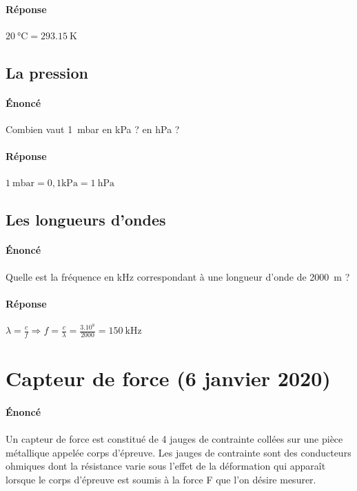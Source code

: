 \documentclass{article}
\begin{document}
\paragraph{Réponse}
$\SI{20}{\celsius} = \SI{293,15}{\kelvin}$

\subsection{La pression}
\paragraph{Énoncé}
Combien vaut \SI{1}{\milli \bar} en \si{\kilo \pascal} ? en \si{\hecto \pascal} ?

\paragraph{Réponse}
$\SI{1}{\milli \bar} = 0,1\si{\kilo \pascal} = \SI{1}{\hecto \pascal}
$

\subsection{Les longueurs d'ondes}
\paragraph{Énoncé}
Quelle est la fréquence en \si{\kilo\hertz} correspondant à une longueur d'onde de \SI{2000}{\meter} ?

\paragraph{Réponse}
$\lambda = \frac{c}{f} \Rightarrow f = \frac{c}{\lambda} = \frac{3.10^8}{2000} = \SI{150}{\kilo\hertz}$


\newpage
\section{Capteur de force (6 janvier 2020)}
\paragraph{Énoncé}
\paragraph{}
Un capteur de force est constitué de 4 jauges de contrainte collées sur une pièce métallique appelée corps d'épreuve. Les jauges de contrainte sont des conducteurs ohmiques dont la résistance varie sous l'effet de la déformation qui apparaît lorsque le corps d'épreuve est soumis à la force F que l'on désire mesurer.
\end{document}
